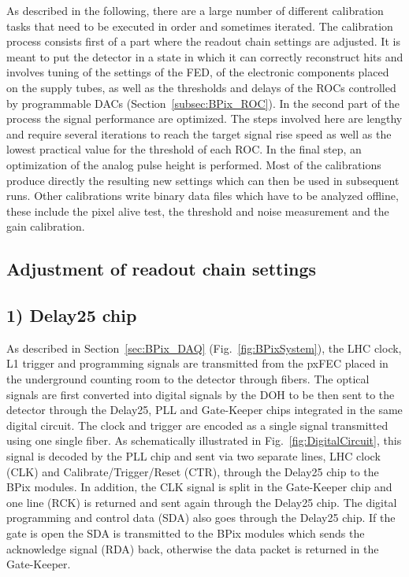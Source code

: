As described in the following, there are a large number of different calibration tasks that need to be executed in order and sometimes iterated.
The calibration process consists first of a part where the readout chain settings are adjusted. It is meant to put the detector in a state in which it can correctly reconstruct hits and involves tuning of the settings of the FED,
of the electronic components placed on the supply tubes, as well as the thresholds and delays of the ROCs controlled by programmable DACs (Section~\ref{subsec:BPix_ROC}).
In the second part of the process the signal performance are optimized. The steps involved here are lengthy and require several iterations to reach the target signal rise speed as well as the lowest practical value for the threshold of each ROC. In the final step, an optimization of the analog pulse height is performed.
Most of the calibrations produce directly the resulting new settings which can then be used in subsequent runs.
Other calibrations write binary data files which have to be analyzed offline, these include the pixel alive test, the threshold and noise measurement and the gain calibration.

\subsection{Adjustment of readout chain settings}\label{subsec:calibPart1}

\subsection*{1) Delay25 chip}

As described in Section~\ref{sec:BPix_DAQ} (Fig.~\ref{fig:BPixSystem}), the LHC clock, L1 trigger and programming signals are transmitted from the pxFEC placed in the underground counting room to the detector through fibers.
The optical signals are first converted into digital signals by the DOH to be then sent to the detector through the Delay25, PLL and Gate-Keeper chips integrated in the same digital circuit.
The clock and trigger are encoded as a single signal transmitted using one single fiber.
As schematically illustrated in Fig.~\ref{fig:DigitalCircuit}, this signal is decoded by the PLL chip and sent via two separate lines, LHC clock (CLK) and Calibrate/Trigger/Reset (CTR), through the Delay25 chip to the BPix modules.
In addition, the CLK signal is split in the Gate-Keeper chip and one line (RCK) is returned and sent again through the Delay25 chip.
The digital programming and control data (SDA) also goes through the Delay25 chip.
If the gate is open the SDA is transmitted to the BPix modules which sends the acknowledge signal (RDA) back, otherwise the data packet is returned in the Gate-Keeper.

